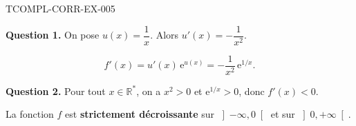 \begin{corrige}{TCOMPL-CORR-EX-005}

\textbf{Question 1.} On pose $u(x) = \dfrac{1}{x}$. Alors $u'(x) = -\dfrac{1}{x^2}$.

\[ f'(x) = u'(x)\,\mathrm{e}^{u(x)} = -\frac{1}{x^2}\,\mathrm{e}^{1/x}. \]


\textbf{Question 2.} Pour tout $x \in \mathbb{R}^*$, on a $x^2 > 0$ et $\mathrm{e}^{1/x} > 0$, donc $f'(x) < 0$.

La fonction $f$ est \textbf{strictement décroissante} sur $\left]-\infty, 0\right[$ et sur $\left]0, +\infty\right[$.

\end{corrige}
